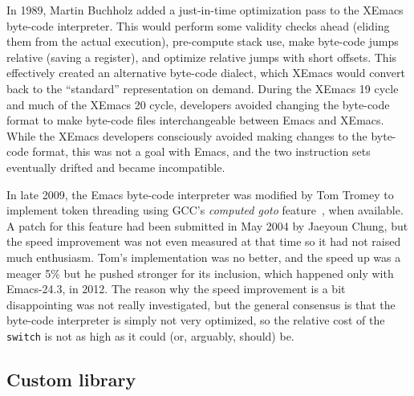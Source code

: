 \documentclass[format=acmsmall, review]{acmart}
\begin{document}
In 1989, Martin Buchholz added a just-in-time optimization pass to the
XEmacs byte-code interpreter.  This
would perform some validity checks ahead (eliding them from the actual
execution), pre-compute stack use, make byte-code jumps relative
(saving a register), and optimize relative jumps with short offsets.
This effectively created an alternative byte-code dialect, which
XEmacs would convert back to the ``standard'' representation on
demand.
During the XEmacs 19 cycle and much of the XEmacs 20 cycle, developers
avoided changing the byte-code format to make byte-code files
interchangeable between Emacs and XEmacs.  While
the XEmacs developers consciously avoided making changes to the
byte-code format, this was not a goal with Emacs, and the two
instruction sets eventually drifted and became incompatible.

In late 2009, the Emacs byte-code interpreter was modified by Tom Tromey to
implement token threading using GCC's \emph{computed goto} feature~\cite{ComputedGOTO}, when
available.  A patch for this feature had been submitted in May 2004 by
Jaeyoun Chung, but the speed improvement was not even measured at that time
so it had not raised much enthusiasm.  Tom's implementation was no better,
and the speed up was a meager 5\% but he pushed stronger for its inclusion,
which happened only with Emacs-24.3, in 2012.  The reason why the speed
improvement is a bit disappointing was not really investigated, but the
general consensus is that the byte-code interpreter is simply not very
optimized, so the relative cost of the \texttt{switch} is not as high as it
could (or, arguably, should) be.

\subsection{Custom library}
\label{sec:custom}
\end{document}
